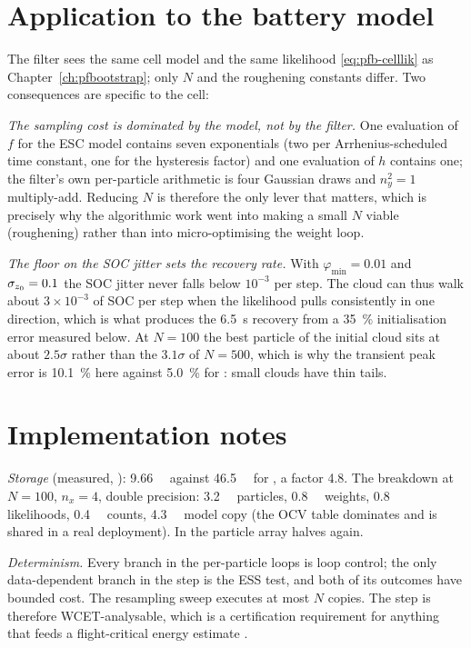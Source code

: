 \section{Application to the battery model}
The filter sees the same cell model and the same likelihood \eqref{eq:pfb-celllik} as
Chapter~\ref{ch:pfbootstrap}; only $N$ and the roughening constants differ.  Two consequences are
specific to the cell:

\emph{The sampling cost is dominated by the model, not by the filter.}  One evaluation of $f$ for
the ESC model contains seven exponentials (two per Arrhenius-scheduled time constant, one for the
hysteresis factor) and one evaluation of $h$ contains one; the filter's own per-particle
arithmetic is four Gaussian draws and $n_y^2 = 1$ multiply-add.  Reducing $N$ is therefore the only
lever that matters, which is precisely why the algorithmic work went into making a small $N$ viable
(roughening) rather than into micro-optimising the weight loop.

\emph{The floor on the SOC jitter sets the recovery rate.}  With $\varphi_{\min} = 0.01$ and
$\sigma_{z_0} = 0.1$ the SOC jitter never falls below $10^{-3}$ per step.  The cloud can thus
walk about $3\times10^{-3}$ of SOC per step when the likelihood pulls consistently in one
direction, which is what produces the \SI{6.5}{\second} recovery from a \SI{35}{\percent}
initialisation error measured below.  At $N=100$ the best particle of the initial cloud sits at
about $2.5\sigma$ rather than the $3.1\sigma$ of $N=500$, which is why the transient peak error is
\SI{10.1}{\percent} here against \SI{5.0}{\percent} for : small clouds have
thin tails.

\section{Implementation notes}
\emph{Storage} (measured, ): \SI{9.66}{\kilo\byte} against \SI{46.5}{\kilo\byte} for
, a factor \num{4.8}.  The breakdown at $N=100$, $n_x=4$, double precision:
\SI{3.2}{\kilo\byte} particles, \SI{0.8}{\kilo\byte} weights, \SI{0.8}{\kilo\byte} likelihoods,
\SI{0.4}{\kilo\byte} counts, \SI{4.3}{\kilo\byte} model copy (the OCV table dominates and is shared
in a real deployment).  In  the particle array halves again.

\emph{Determinism.}  Every branch in the per-particle loops is loop control; the only
data-dependent branch in the step is the ESS test, and both of its outcomes have bounded cost.  The
resampling sweep executes at most $N$ copies.  The step is therefore WCET-analysable, which is a
certification requirement for anything that feeds a flight-critical energy estimate
\cite{rtca2017do311a}.

